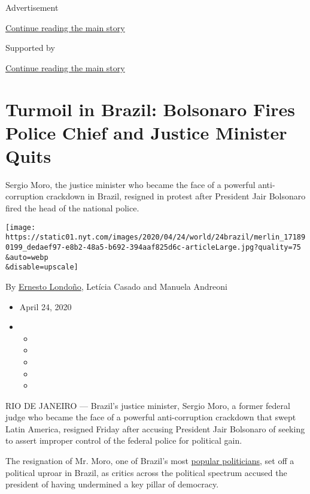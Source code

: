 Advertisement

\protect\hyperlink{after-top}{Continue reading the main story}

Supported by

\protect\hyperlink{after-sponsor}{Continue reading the main story}

\hypertarget{turmoil-in-brazil-bolsonaro-fires-police-chief-and-justice-minister-quits}{%
\section{Turmoil in Brazil: Bolsonaro Fires Police Chief and Justice
Minister
Quits}\label{turmoil-in-brazil-bolsonaro-fires-police-chief-and-justice-minister-quits}}

Sergio Moro, the justice minister who became the face of a powerful
anti-corruption crackdown in Brazil, resigned in protest after President
Jair Bolsonaro fired the head of the national police.

\texttt{[image: https://static01.nyt.com/images/2020/04/24/world/24brazil/merlin\_171890199\_dedaef97-e8b2-48a5-b692-394aaf825d6c-articleLarge.jpg?quality=75\\\&auto=webp\\\&disable=upscale]}

By \href{https://www.nytimes.com/by/ernesto-londono}{Ernesto Londoño},
Letícia Casado and Manuela Andreoni

\begin{itemize}
\item
  April 24, 2020
\item
  \begin{itemize}
  \item
  \item
  \item
  \item
  \item
  \end{itemize}
\end{itemize}

RIO DE JANEIRO --- Brazil's justice minister, Sergio Moro, a former
federal judge who became the face of a powerful anti-corruption
crackdown that swept Latin America, resigned Friday after accusing
President Jair Bolsonaro of seeking to assert improper control of the
federal police for political gain.

The resignation of Mr. Moro, one of Brazil's most
\href{https://www.nytimes.com/2018/11/01/world/americas/brazil-judge-lula-bolsonaro.html}{popular
politicians}, set off a political uproar in Brazil, as critics across
the political spectrum accused the president of having undermined a key
pillar of democracy.

